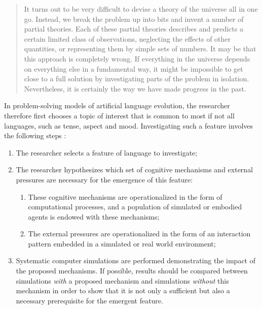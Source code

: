 \begin{quote}
It turns out to be very difficult to devise a theory of the universe all in one go. Instead, we break the problem up into bits and invent a number of partial theories. Each of these partial theories describes and predicts a certain limited class of observations, neglecting the effects of other quantities, or representing them by simple sets of numbers. It may be that this approach is completely wrong. If everything in the universe depends on everything else in a fundamental way, it might be impossible to get close to a full solution by investigating parts of the problem in isolation. Nevertheless, it is certainly the way we have made progress in the past. 
\\ \cite[12]{hawkin88brief}
\end{quote}

In problem-solving models of artificial language evolution, the researcher therefore first chooses a topic of interest that is common to most if not all languages, such as tense, aspect and mood. Investigating such a feature involves the following steps \citep{steels06how}:


\begin{enumerate}
\item The researcher selects a feature of language to investigate;
\item The researcher hypothesizes which set of cognitive mechanisms and external pressures are necessary for the emergence of this feature:
\begin{enumerate}
\item These cognitive mechanisms are operationalized in the form of computational processes, and a population of simulated or embodied agents is endowed with these mechanisms;
\item The external pressures are operationalized in the form of an interaction pattern embedded in a simulated or real world environment;
\end{enumerate}
\item Systematic computer simulations are performed demonstrating the impact of the proposed mechanisms. If possible, results should be compared between simulations {\em with} a proposed mechanism and simulations {\em without} this mechanism in order to show that it is not only a sufficient but also a necessary prerequisite for the emergent feature. 
\end{enumerate}

